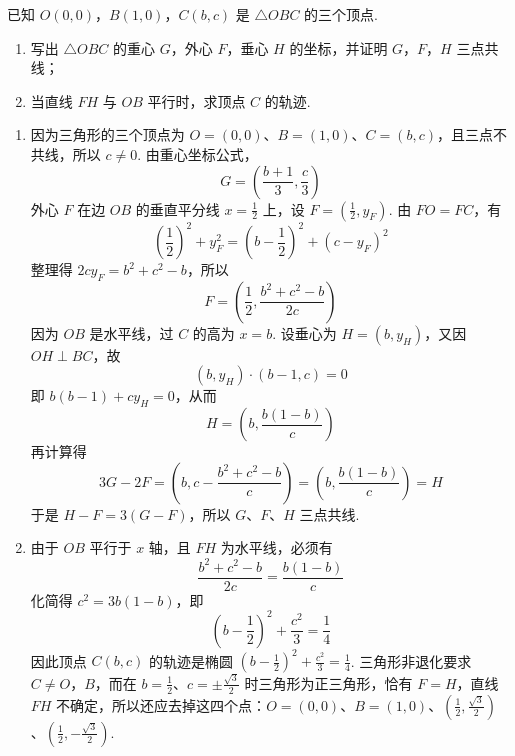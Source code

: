 \begin{problem}
已知 \(O(0,0)\)，\(B(1,0)\)，\(C(b,c)\) 是 \(\triangle OBC\) 的三个顶点.

\begin{enumerate}
\item 写出 \(\triangle OBC\) 的重心 \(G\)，外心 \(F\)，垂心 \(H\) 的坐标，并证明 \(G\)，\(F\)，\(H\) 三点共线；
\item 当直线 \(FH\) 与 \(OB\) 平行时，求顶点 \(C\) 的轨迹.
\end{enumerate}

\begin{solution}
\begin{enumerate}
\item 因为三角形的三个顶点为 \(O=(0,0)\)、\(B=(1,0)\)、\(C=(b,c)\)，且三点不共线，所以 \(c\ne0\). 由重心坐标公式，
\[
G=\left(\frac{b+1}{3},\frac{c}{3}\right)
\]
外心 \(F\) 在边 \(OB\) 的垂直平分线 \(x=\frac12\) 上，设 \(F=\left(\frac12,y_F\right)\). 由 \(FO=FC\)，有
\[
\left(\frac12\right)^2+y_F^2=\left(b-\frac12\right)^2+(c-y_F)^2
\]
整理得 \(2cy_F=b^2+c^2-b\)，所以
\[
F=\left(\frac12,\frac{b^2+c^2-b}{2c}\right)
\]
因为 \(OB\) 是水平线，过 \(C\) 的高为 \(x=b\). 设垂心为 \(H=(b,y_H)\)，又因 \(OH\perp BC\)，故
\[
(b,y_H)\cdot(b-1,c)=0
\]
即 \(b(b-1)+cy_H=0\)，从而
\[
H=\left(b,\frac{b(1-b)}{c}\right)
\]
再计算得
\[
3G-2F=\left(b,c-\frac{b^2+c^2-b}{c}\right)=\left(b,\frac{b(1-b)}{c}\right)=H
\]
于是 \(H-F=3(G-F)\)，所以 \(G\)、\(F\)、\(H\) 三点共线.
\item 由于 \(OB\) 平行于 \(x\) 轴，且 \(FH\) 为水平线，必须有
\[
\frac{b^2+c^2-b}{2c}=\frac{b(1-b)}{c}
\]
化简得 \(c^2=3b(1-b)\)，即
\[
\left(b-\frac12\right)^2+\frac{c^2}{3}=\frac14
\]
因此顶点 \(C(b,c)\) 的轨迹是椭圆 \(\left(b-\frac12\right)^2+\frac{c^2}{3}=\frac14\). 三角形非退化要求 \(C\ne O\)，\(B\)，而在 \(b=\frac12\)、\(c=\pm\frac{\sqrt{3}}{2}\) 时三角形为正三角形，恰有 \(F=H\)，直线 \(FH\) 不确定，所以还应去掉这四个点：\(O=(0,0)\)、\(B=(1,0)\)、\(\left(\frac12,\frac{\sqrt{3}}{2}\right)\)、\(\left(\frac12,-\frac{\sqrt{3}}{2}\right)\).
\end{enumerate}
\end{solution}
\end{problem}

